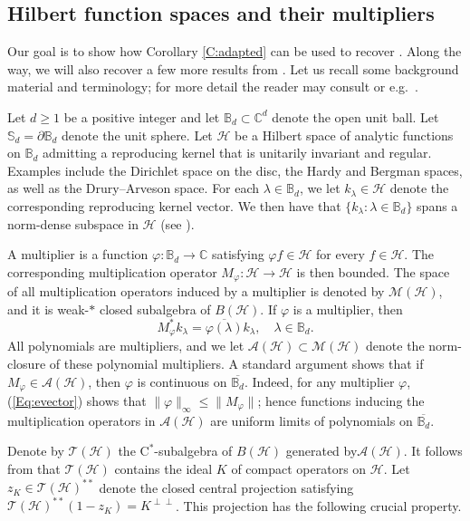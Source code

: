 \documentclass[10pt]{amsart}
\newcommand{\bB}{{\mathbb{B}}}
\newcommand{\bC}{{\mathbb{C}}}
\newcommand{\bS}{{\mathbb{S}}}
\newcommand{\A}{{\mathcal{A}}}
\renewcommand{\H}{{\mathcal{H}}}
\newcommand{\M}{{\mathcal{M}}}
\newcommand{\T}{{\mathcal{T}}}
\newcommand{\rC}{\mathrm{C}}
\renewcommand{\phi}{\varphi}
\newcommand{\ol}{\overline}
\theoremstyle{definition}
\begin{document}
\subsection{Hilbert function spaces and their multipliers}\label{SS:HFS}

Our goal is to show how Corollary \ref{C:adapted} can be used to recover \cite[Theorem 10.3]{DH2023}. 
Along the way, we will also recover a few more results from \cite{DH2023}.
Let us recall some background material and terminology; for more detail the reader may consult \cite{DH2023}
or e.g.\ \cite[Section 5]{CT2023Henkin}.

Let $d\geq 1$ be a positive integer and let $\bB_d\subset \bC^d$ denote the open unit ball. Let $\bS_d=\partial \bB_d$ denote the unit sphere. Let $\H$ be a Hilbert space of analytic functions on $\bB_d$ admitting  a reproducing kernel that is unitarily invariant and regular. Examples include the Dirichlet space on the disc, the Hardy and Bergman spaces, as well as the Drury--Arveson space. For each $\lambda\in \bB_d$, we let $k_\lambda\in \H$ denote the corresponding reproducing kernel vector. We then have that $\{k_\lambda:\lambda\in \bB_d\}$ spans a norm-dense subspace in $\H$ (see \cite{GHX04}).

A multiplier is a function $\phi:\bB_d\to\bC$ satisfying $\phi f\in \H$ for every $f\in \H$. The corresponding multiplication operator $M_\phi:\H\to\H$ is then bounded. The space of all multiplication operators induced by a multiplier is denoted by $\M(\H)$, and it is weak-$*$ closed subalgebra of $B(\H)$. If $\phi$ is a multiplier, then
\begin{equation}\label{Eq:evector}
M_\phi^* k_\lambda=\ol{\phi(\lambda)}k_\lambda, \quad  \lambda\in \bB_d.
\end{equation}
All polynomials are multipliers, and we let $\A(\H)\subset \M(\H)$ denote the norm-closure of these polynomial multipliers. A standard argument 
shows that if $M_\phi\in \A(\H)$, then $\phi$ is continuous on $\ol{\bB_d}$. 
 Indeed, for any multiplier $\phi$,  (\ref{Eq:evector}) shows that $\| \phi \|_\infty \leq \| M_\phi \|$; hence functions inducing the multiplication operators in $\A(\H)$ are uniform limits of polynomials on $\ol{\bB_d}$.

Denote by  $\T(\H)$ the $\rC^*$-subalgebra of $B(\H)$ generated by$\A(\H)$. It follows from \cite[Theorem 4.6]{GHX04} that $\T(\H)$ contains the ideal $K$ of compact operators  on $\H$. Let $z_K\in \T(\H)^{**}$ denote the closed central projection satisfying $\T(\H)^{**}(1-z_K)=K^{\perp\perp}$. This projection has the following crucial property.
\end{document}

